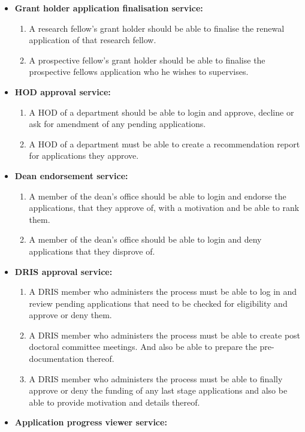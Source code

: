 \documentclass[12pt]{article}
\begin{document}
\begin{itemize}
\begin{enumerate}
		\end{enumerate}
		\item \textbf{Grant holder application finalisation service:}
		\begin{enumerate}		
			\item A research fellow's grant holder should be able to finalise the renewal application of that research fellow.
			\item A prospective fellow's grant holder should be able to finalise the prospective fellows application who he wishes to  supervises.				 					
		\end{enumerate}
		\item \textbf{HOD approval service:}
		\begin{enumerate}		
			\item A HOD of a department should be able to login and approve, decline or ask for amendment of any pending applications.
			\item A HOD of a department must be able to create a recommendation report for applications they approve.				 					
		\end{enumerate}
		\item \textbf{Dean endorsement service:}
		\begin{enumerate}		
			\item A member of the dean's office should be able to login and endorse the applications, that they approve of, with a motivation and be able to rank them.
			\item A member of the dean's office should be able to login and deny applications that they disprove of.				 					
		\end{enumerate}
		\item \textbf{DRIS approval service:}
		\begin{enumerate}		
			\item A DRIS member who administers the process must be able to log in and review pending applications that need to be checked for eligibility and approve or deny them.
			\item A DRIS member who administers the process must be able to create post doctoral committee meetings. And also be able to prepare the pre-documentation thereof.
			\item A DRIS member who administers the process must be able to finally approve or deny the funding of any last stage applications and also be able to provide motivation and details thereof.				 					
		\end{enumerate}
		\item\textbf{Application progress viewer service:}

\end{itemize}
\end{document}
